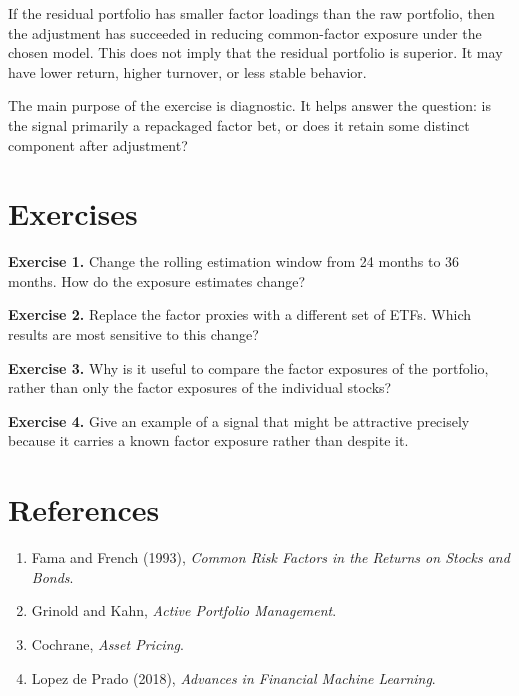 \documentclass[11pt]{article}
\newcommand{\answerlines}[1]{\vspace{#1\baselineskip}}
\begin{document}
If the residual portfolio has smaller factor loadings than the raw portfolio,
then the adjustment has succeeded in reducing common-factor exposure under the
chosen model. This does not imply that the residual portfolio is superior. It
may have lower return, higher turnover, or less stable behavior.

The main purpose of the exercise is diagnostic. It helps answer the question:
is the signal primarily a repackaged factor bet, or does it retain some
distinct component after adjustment?

\newpage

\section*{Exercises}

\textbf{Exercise 1.} Change the rolling estimation window from 24 months to 36
months. How do the exposure estimates change?

\answerlines{6}

\textbf{Exercise 2.} Replace the factor proxies with a different set of ETFs.
Which results are most sensitive to this change?

\answerlines{6}

\textbf{Exercise 3.} Why is it useful to compare the factor exposures of the
portfolio, rather than only the factor exposures of the individual stocks?

\answerlines{6}

\textbf{Exercise 4.} Give an example of a signal that might be attractive
precisely because it carries a known factor exposure rather than despite it.

\answerlines{6}

\section*{References}

\begin{enumerate}
  \item Fama and French (1993), \textit{Common Risk Factors in the Returns on Stocks and Bonds}.
  \item Grinold and Kahn, \textit{Active Portfolio Management}.
  \item Cochrane, \textit{Asset Pricing}.
  \item Lopez de Prado (2018), \textit{Advances in Financial Machine Learning}.
\end{enumerate}
\end{document}

